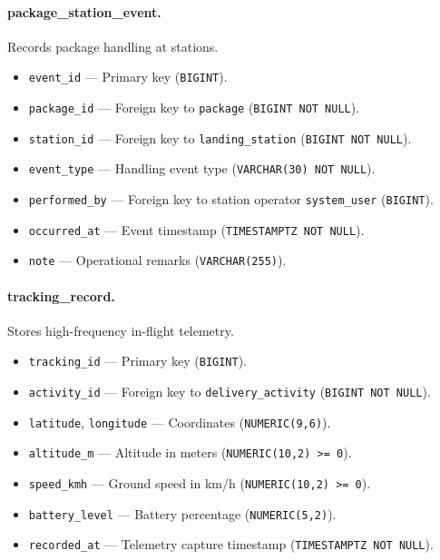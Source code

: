\paragraph{package\_station\_event.}
Records package handling at stations.
\begin{itemize}
    \item \texttt{event\_id} — Primary key (\texttt{BIGINT}).
    \item \texttt{package\_id} — Foreign key to \texttt{package} (\texttt{BIGINT NOT NULL}).
    \item \texttt{station\_id} — Foreign key to \texttt{landing\_station} (\texttt{BIGINT NOT NULL}).
    \item \texttt{event\_type} — Handling event type (\texttt{VARCHAR(30) NOT NULL}).
    \item \texttt{performed\_by} — Foreign key to station operator \texttt{system\_user} (\texttt{BIGINT}).
    \item \texttt{occurred\_at} — Event timestamp (\texttt{TIMESTAMPTZ NOT NULL}).
    \item \texttt{note} — Operational remarks (\texttt{VARCHAR(255)}).
\end{itemize}

\paragraph{tracking\_record.}
Stores high-frequency in-flight telemetry.
\begin{itemize}
    \item \texttt{tracking\_id} — Primary key (\texttt{BIGINT}).
    \item \texttt{activity\_id} — Foreign key to \texttt{delivery\_activity} (\texttt{BIGINT NOT NULL}).
    \item \texttt{latitude}, \texttt{longitude} — Coordinates (\texttt{NUMERIC(9,6)}).
    \item \texttt{altitude\_m} — Altitude in meters (\texttt{NUMERIC(10,2) >= 0}).
    \item \texttt{speed\_kmh} — Ground speed in km/h (\texttt{NUMERIC(10,2) >= 0}).
    \item \texttt{battery\_level} — Battery percentage (\texttt{NUMERIC(5,2)}).
    \item \texttt{recorded\_at} — Telemetry capture timestamp (\texttt{TIMESTAMPTZ NOT NULL}).
\end{itemize}

